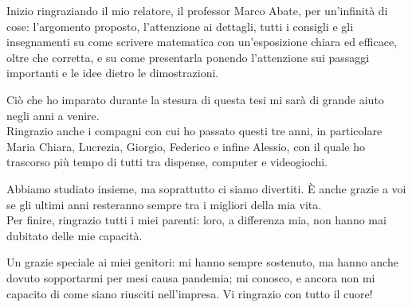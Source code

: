 Inizio ringraziando il mio relatore, il professor Marco Abate, per un'infinità di cose: l'argomento proposto, l'attenzione ai dettagli, tutti i consigli e gli insegnamenti su come scrivere matematica con un'esposizione chiara ed efficace, oltre che corretta, e su come presentarla ponendo l'attenzione sui passaggi importanti e le idee dietro le dimostrazioni.

Ciò che ho imparato durante la stesura di questa tesi mi sarà di grande aiuto negli anni a venire. \\

Ringrazio anche i compagni con cui ho passato questi tre anni, in particolare Maria Chiara, Lucrezia, Giorgio, Federico e infine Alessio, con il quale ho trascorso più tempo di tutti tra dispense, computer e videogiochi.

Abbiamo studiato insieme, ma soprattutto ci siamo divertiti. È anche grazie a voi se gli ultimi anni resteranno sempre tra i migliori della mia vita. \\

Per finire, ringrazio tutti i miei parenti: loro, a differenza mia, non hanno mai dubitato delle mie capacità.

Un grazie speciale ai miei genitori: mi hanno sempre sostenuto, ma hanno anche dovuto sopportarmi per mesi causa pandemia; mi conosco, e ancora non mi capacito di come siano riusciti nell'impresa. Vi ringrazio con tutto il cuore!

